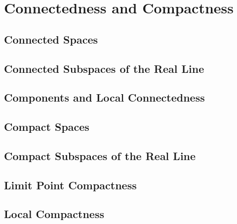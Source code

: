 \chapter{Connectedness and Compactness}

\section{Connected Spaces}

\section{Connected Subspaces of the Real Line}

\section{Components and Local Connectedness}

\section{Compact Spaces}

\section{Compact Subspaces of the Real Line}

\section{Limit Point Compactness}

\section{Local Compactness}
